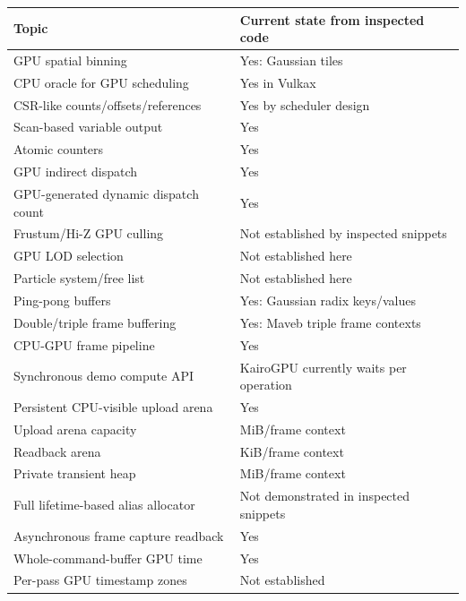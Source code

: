 {\def\LTcaptype{none} %
\begin{longtable}[]{@{}
  >{\raggedright\arraybackslash}p{}
  >{\raggedright\arraybackslash}p{}@{}}
\toprule\noalign{}
\begin{minipage}[b]{\linewidth}\raggedright
Topic
\end{minipage} & \begin{minipage}[b]{\linewidth}\raggedright
Current state from inspected code
\end{minipage} \\
\midrule\noalign{}
\endhead
\bottomrule\noalign{}
\endlastfoot
GPU spatial binning & Yes: Gaussian tiles \\
CPU oracle for GPU scheduling & Yes in Vulkax \\
CSR-like counts/offsets/references & Yes by scheduler design \\
Scan-based variable output & Yes \\
Atomic counters & Yes \\
GPU indirect dispatch & Yes \\
GPU-generated dynamic dispatch count & Yes \\
Frustum/Hi-Z GPU culling & Not established by inspected snippets \\
GPU LOD selection & Not established here \\
Particle system/free list & Not established here \\
Ping-pong buffers & Yes: Gaussian radix keys/values \\
Double/triple frame buffering & Yes: Maveb triple frame contexts \\
CPU-GPU frame pipeline & Yes \\
Synchronous demo compute API & KairoGPU currently waits per operation \\
Persistent CPU-visible upload arena & Yes \\
Upload arena capacity & 8 MiB/frame context \\
Readback arena & 256 KiB/frame context \\
Private transient heap & 64 MiB/frame context \\
Full lifetime-based alias allocator & Not demonstrated in inspected snippets \\
Asynchronous frame capture readback & Yes \\
Whole-command-buffer GPU time & Yes \\
Per-pass GPU timestamp zones & Not established \\

\end{longtable}}
